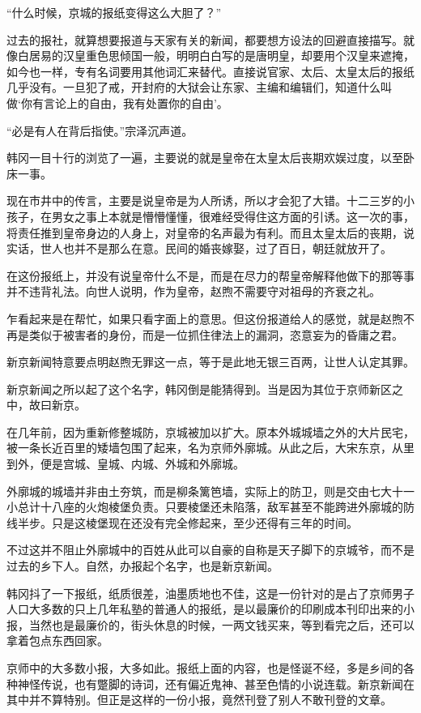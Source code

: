 “什么时候，京城的报纸变得这么大胆了？”

过去的报社，就算想要报道与天家有关的新闻，都要想方设法的回避直接描写。就像白居易的汉皇重色思倾国一般，明明白白写的是唐明皇，却要用个汉皇来遮掩，如今也一样，专有名词要用其他词汇来替代。直接说官家、太后、太皇太后的报纸几乎没有。一旦犯了戒，开封府的大狱会让东家、主编和编辑们，知道什么叫做‘你有言论上的自由，我有处置你的自由’。

“必是有人在背后指使。”宗泽沉声道。

韩冈一目十行的浏览了一遍，主要说的就是皇帝在太皇太后丧期欢娱过度，以至卧床一事。

现在市井中的传言，主要是说皇帝是为人所诱，所以才会犯了大错。十二三岁的小孩子，在男女之事上本就是懵懵懂懂，很难经受得住这方面的引诱。这一次的事，将责任推到皇帝身边的人身上，对皇帝的名声最为有利。而且太皇太后的丧期，说实话，世人也并不是那么在意。民间的婚丧嫁娶，过了百日，朝廷就放开了。

在这份报纸上，并没有说皇帝什么不是，而是在尽力的帮皇帝解释他做下的那等事并不违背礼法。向世人说明，作为皇帝，赵煦不需要守对祖母的齐衰之礼。

乍看起来是在帮忙，如果只看字面上的意思。但这份报道给人的感觉，就是赵煦不再是类似于被害者的身份，而是一位抓住律法上的漏洞，恣意妄为的昏庸之君。

新京新闻特意要点明赵煦无罪这一点，等于是此地无银三百两，让世人认定其罪。

新京新闻之所以起了这个名字，韩冈倒是能猜得到。当是因为其位于京师新区之中，故曰新京。

在几年前，因为重新修整城防，京城被加以扩大。原本外城城墙之外的大片民宅，被一条长近百里的矮墙包围了起来，名为京师外廓城。从此之后，大宋东京，从里到外，便是宫城、皇城、内城、外城和外廓城。

外廓城的城墙并非由土夯筑，而是柳条篱笆墙，实际上的防卫，则是交由七大十一小总计十八座的火炮棱堡负责。只要棱堡还未陷落，敌军甚至不能跨进外廓城的防线半步。只是这棱堡现在还没有完全修起来，至少还得有三年的时间。

不过这并不阻止外廓城中的百姓从此可以自豪的自称是天子脚下的京城爷，而不是过去的乡下人。自然，办报起个名字，也是新京新闻。

韩冈抖了一下报纸，纸质很差，油墨质地也不佳，这是一份针对的是占了京师男子人口大多数的只上几年私塾的普通人的报纸，是以最廉价的印刷成本刊印出来的小报，当然也是最廉价的，街头休息的时候，一两文钱买来，等到看完之后，还可以拿着包点东西回家。

京师中的大多数小报，大多如此。报纸上面的内容，也是怪诞不经，多是乡间的各种神怪传说，也有蹩脚的诗词，还有偏近鬼神、甚至色情的小说连载。新京新闻在其中并不算特别。但正是这样的一份小报，竟然刊登了别人不敢刊登的文章。

